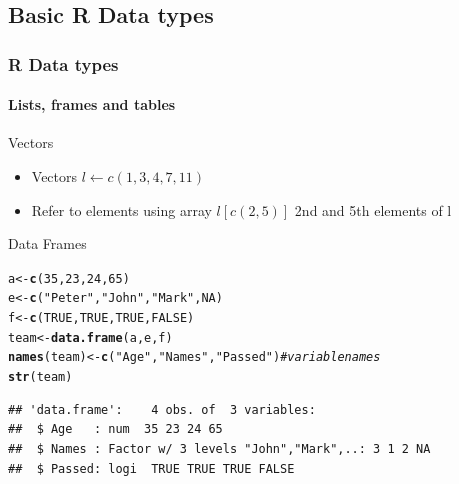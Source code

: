 \documentclass[10pt,handout,english]{beamer}\usepackage[]{graphicx}\usepackage[]{color}
\makeatletter
\newcommand{\hlnum}[1]{\textcolor[rgb]{0.686,0.059,0.569}{#1}}%
\newcommand{\hlstr}[1]{\textcolor[rgb]{0.192,0.494,0.8}{#1}}%
\newcommand{\hlcom}[1]{\textcolor[rgb]{0.678,0.584,0.686}{\textit{#1}}}%
\newcommand{\hlstd}[1]{\textcolor[rgb]{0.345,0.345,0.345}{#1}}%
\newcommand{\hlkwb}[1]{\textcolor[rgb]{0.69,0.353,0.396}{#1}}%
\newcommand{\hlkwd}[1]{\textcolor[rgb]{0.737,0.353,0.396}{\textbf{#1}}}%
\newenvironment{kframe}{%
 \def\at@end@of@kframe{}%
 \ifinner\ifhmode%
  \def\at@end@of@kframe{\end{minipage}}%
  \begin{minipage}{\columnwidth}%
 \fi\fi%
 \def\FrameCommand##1{\hskip\@totalleftmargin \hskip-\fboxsep
 \colorbox{shadecolor}{##1}\hskip-\fboxsep
     \hskip-\linewidth \hskip-\@totalleftmargin \hskip\columnwidth}%
 \MakeFramed {\advance\hsize-\width
   \@totalleftmargin\z@ \linewidth\hsize
   \@setminipage}}%
 {\par\unskip\endMakeFramed%
 \at@end@of@kframe}
\newenvironment{knitrout}{}{} %
\makeatother
\begin{document}
\subsection*{Basic R Data types}
\begin{frame}[fragile]
  \frametitle{R Data types}
  \framesubtitle{Lists, frames and tables}
  \begin{block}{Vectors}
      \begin{itemize}
         \item  Vectors $l\leftarrow c(1,3,4,7,11)$
         \item  Refer to elements using array $l[c(2,5)]$ 2nd and 5th elements of l
    \end{itemize}
  \end{block}
  \begin{block}{Data Frames}
 \end{block} 
\begin{knitrout}
\color{fgcolor}\begin{kframe}
\begin{alltt}
\hlstd{a} \hlkwb{<-} \hlkwd{c}\hlstd{(}\hlnum{35}\hlstd{,}\hlnum{23}\hlstd{,}\hlnum{24}\hlstd{,}\hlnum{65}\hlstd{)}
\hlstd{e} \hlkwb{<-} \hlkwd{c}\hlstd{(}\hlstr{"Peter"}\hlstd{,} \hlstr{"John"}\hlstd{,} \hlstr{"Mark"}\hlstd{,} \hlnum{NA}\hlstd{)}
\hlstd{f} \hlkwb{<-} \hlkwd{c}\hlstd{(}\hlnum{TRUE}\hlstd{,}\hlnum{TRUE}\hlstd{,}\hlnum{TRUE}\hlstd{,}\hlnum{FALSE}\hlstd{)}
\hlstd{team} \hlkwb{<-} \hlkwd{data.frame}\hlstd{(a,e,f)}
\hlkwd{names}\hlstd{(team)} \hlkwb{<-} \hlkwd{c}\hlstd{(}\hlstr{"Age"}\hlstd{,}\hlstr{"Names"}\hlstd{,}\hlstr{"Passed"}\hlstd{)} \hlcom{# variable names}
\hlkwd{str}\hlstd{(team)}
\end{alltt}
\begin{verbatim}
## 'data.frame':	4 obs. of  3 variables:
##  $ Age   : num  35 23 24 65
##  $ Names : Factor w/ 3 levels "John","Mark",..: 3 1 2 NA
##  $ Passed: logi  TRUE TRUE TRUE FALSE
\end{verbatim}
\end{kframe}
\end{knitrout}
 
\end{frame}  
\end{document}
